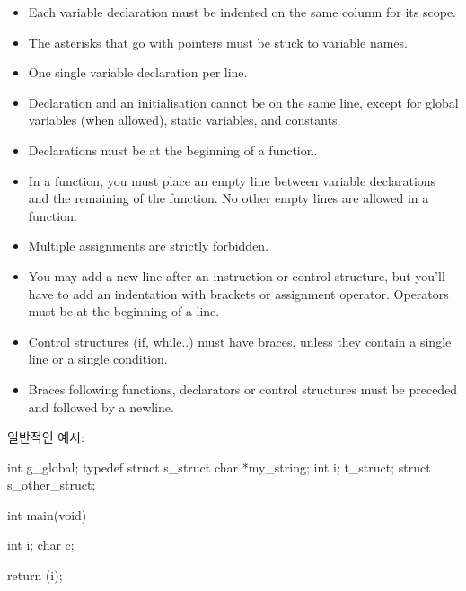 \documentclass{42-ko}
\begin{document}
\begin{itemize}
                \item Each variable declaration must be indented on the same
                  column for its scope.

                \item The asterisks that go with pointers must be stuck to
                  variable names.

                \item One single variable declaration per line.

                \item Declaration and an initialisation cannot be
                  on the same line, except for global variables (when allowed),
                  static variables, and constants.

                \item Declarations must be at the beginning of a function.

                \item In a function, you must place an empty line between 
                    variable declarations and the remaining of the function.
                    No other empty lines are allowed in a function.

                \item Multiple assignments are strictly forbidden.

                \item You may add a new line after an instruction or
                  control structure, but you'll have to add an
                  indentation with brackets or assignment operator.
                  Operators must be at the beginning of a line.

                \item Control structures (if, while..) must have braces, unless they contain a single 
                    line or a single condition.
                
                \item Braces following functions, declarators or control structures must be preceded and followed by a newline.
                
            \end{itemize}

            \newpage

            일반적인 예시:
            \begin{42ccode}
int             g_global;
typedef struct  s_struct
{
    char    *my_string;
    int     i;
}               t_struct;
struct          s_other_struct;

int     main(void)
{
    int     i;
    char    c;

    return (i);
}
            \end{42ccode}
            \newpage
\end{document}
